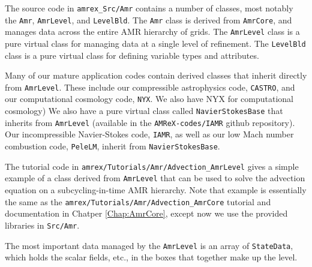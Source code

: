 The source code in {\tt amrex\_Src/Amr} contains a number of classes, most notably
the {\tt Amr}, {\tt AmrLevel}, and {\tt LevelBld}.
The {\tt Amr} class is derived from {\tt AmrCore}, and manages data across the 
entire AMR hierarchy of grids.
The {\tt AmrLevel} class is a pure virtual class for managing data at a
single level of refinement.
The {\tt LevelBld} class is a pure virtual class for defining variable types
and attributes.

Many of our mature application codes contain derived classes that inherit directly
from {\tt AmrLevel}.  These include our compressible astrophysics code,
{\tt CASTRO}, and our computational cosmology code, {\tt NYX}.  We also have
NYX for computational cosmology)   We also have 
a pure virtual class called {\tt NavierStokesBase} that inherits from {\tt AmrLevel}
(available in the {\tt AMReX-codes/IAMR} github repository).  Our incompressible
Navier-Stokes code, {\tt IAMR}, as well as our low Mach number combustion code,
{\tt PeleLM}, inherit from {\tt NavierStokesBase}.

The tutorial code in {\tt amrex/Tutorials/Amr/Advection\_AmrLevel} gives a simple
example of a class derived from {\tt AmrLevel} that can be used to solve
the advection equation on a subcycling-in-time AMR hierarchy.  Note that example
is essentially the same as the {\tt amrex/Tutorials/Amr/Advection\_AmrCore} tutorial
and documentation in Chatper \ref{Chap:AmrCore}, except now we use the provided
libraries in {\tt Src/Amr}.

The most important data managed by the {\tt AmrLevel} is an array of {\tt StateData},
which holds the scalar fields, etc., in the boxes that together make up the level.

